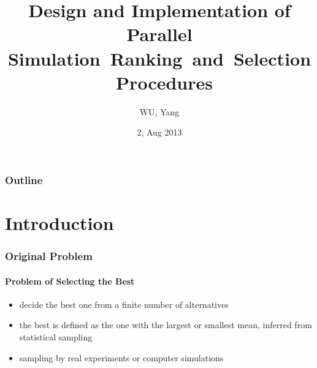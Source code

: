 \documentclass{beamer}
\begin{document}
\title[Parallel Simulation R\&S Procedures]
{
Design and Implementation of Parallel Simulation~Ranking~and~Selection~Procedures
}
\author{WU, Yang}
\date{2, Aug 2013}

\begin{frame}
\titlepage
\end{frame}

\begin{frame}
\frametitle{Outline}
\tableofcontents
\end{frame}


\section{Introduction}

\begin{frame}
\frametitle{Original Problem}
\framesubtitle{Problem of Selecting the Best}
\begin{itemize}
\item decide the best one from a finite number of alternatives
\vspace{\baselineskip}
\item the best is defined as the one with the largest or smallest mean, inferred from statistical sampling
\vspace{\baselineskip}
\item sampling by real experiments or computer simulations
\end{itemize}
\end{frame}
\end{document}
